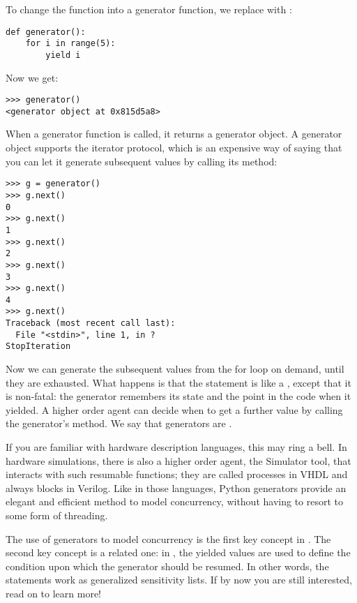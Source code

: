 To change the function into a generator function, we replace
 with :

\begin{verbatim}
def generator():
    for i in range(5):
        yield i

\end{verbatim}

Now we get:

\begin{verbatim}
>>> generator()
<generator object at 0x815d5a8>

\end{verbatim}

When a generator function is called, it returns a generator object. A
generator object supports the iterator protocol, which is an expensive
way of saying that you can let it generate subsequent values by
calling its  method:

\begin{verbatim}
>>> g = generator()
>>> g.next()
0
>>> g.next()
1
>>> g.next()
2
>>> g.next()
3
>>> g.next()
4
>>> g.next()
Traceback (most recent call last):
  File "<stdin>", line 1, in ?
StopIteration

\end{verbatim}

Now we can generate the subsequent values from the for
loop on demand, until they are exhausted. What happens is that the
 statement is like a
, except that it is non-fatal: the generator remembers
its state and the point in the code when it yielded. A higher order
agent can decide when to get a further value by calling the
generator's  method. We say that generators are
.

If you are familiar with hardware description languages, this may
ring a bell. In hardware simulations, there is also a higher order
agent, the Simulator tool, that interacts with such resumable
functions; they are called processes in VHDL and always blocks in
Verilog. Like in those languages, Python generators provide an elegant
and efficient method to model concurrency, without having to resort to
some form of threading.

The use of generators to model concurrency is the first key concept in
\myhdl{}. The second key concept is a related one: in \myhdl{}, the
yielded values are used to define the condition upon which the generator
should be resumed. In other words, the  statements work
as generalized sensitivity lists. If by now you are still interested,
read on to learn more!

